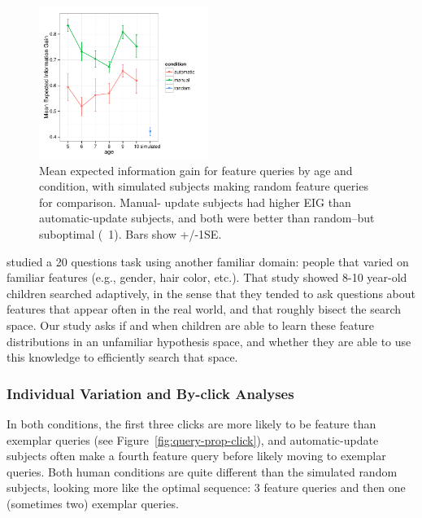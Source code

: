 \documentclass[10pt,letterpaper]{article}
\begin{document}
\begin{figure}[t]
  \centering
  \includegraphics[width=0.49\textwidth]{figures/EIG_by_age_n_condition}
  \caption{Mean expected information gain for feature queries by age and condition, 
with simulated subjects making random feature queries for comparison. Manual-
update subjects had higher EIG than automatic-update subjects, and both were 
better than random--but suboptimal (~1). Bars show +/-1SE.}
  \label{fig:EIG_by_age}
\end{figure} 


 studied a 20 questions task using another familiar domain: 
people that varied on familiar features (e.g., gender, hair color, etc.). That study 
showed 8-10 year-old children searched adaptively, in the sense that they tended to 
ask questions about features that appear often in the real world, and that roughly 
bisect the search space. Our study asks if and when children are able to learn these 
feature distributions in an unfamiliar hypothesis space, and whether they are able to 
use this knowledge to efficiently search that space.

\subsubsection{Individual Variation and By-click Analyses}



In both conditions, the first three clicks are more likely to be feature than exemplar 
queries (see Figure~\ref{fig:query-prop-click}), and automatic-update subjects often 
make a fourth feature query before likely moving to exemplar queries. Both human 
conditions are quite different than the simulated random subjects, looking more like 
the optimal sequence: 3 feature queries and then one (sometimes two) exemplar 
queries. 
\end{document}
